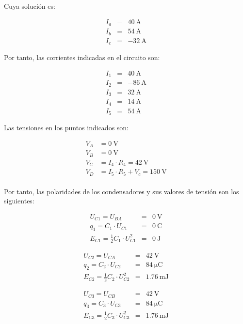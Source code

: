 Cuya solución es:

\begin{eqnarray*}
I_a & = & \qty{40}{\ampere}\\
I_b & = & \qty{54}{\ampere}\\
I_c & = & -\qty{32}{\ampere}
\end{eqnarray*}

Por tanto, las corrientes indicadas en el circuito son:

\begin{eqnarray*}
I_1 & = & \qty{40}{\ampere}\\
I_2 & = & \qty{-86}{\ampere}\\
I_3 & = &  \qty{32}{\ampere}\\
I_4 & = &  \qty{14}{\ampere}\\
I_5 & = &  \qty{54}{\ampere}
\end{eqnarray*}

Las tensiones en los puntos indicados son:

\begin{align*}
V_A &= \qty{0}{\volt}\\
V_B &= \qty{0}{\volt}\\
V_C &= I_4 \cdot R_4 = \qty{42}{\volt}\\
V_D &= I_5 \cdot R_5 + V_c = \qty{150}{\volt}\\
\end{align*}

Por tanto, las polaridades de los condensadores y sus valores de tensión son los siguientes:

\begin{eqnarray*}
U_{C1} = U_{BA} & = & \qty{0}{\volt}\\
q_1 = C_1 \cdot U_{C1} & = & \qty{0}{\coulomb}\\
E_{C1} = \frac{1}{2} C_1 \cdot U_{C1}^2 & = & \qty{0}{\joule}
\end{eqnarray*}

\begin{eqnarray*}
U_{C2} = U_{CA} & = & \qty{42}{\volt}\\
q_2 = C_2 \cdot U_{C2} & = & \qty{84}{\micro\coulomb}\\
E_{C2} = \frac{1}{2} C_2 \cdot U_{C2}^2 & = & \qty{1.76}{\milli\joule}
\end{eqnarray*}

\begin{eqnarray*}
U_{C3} = U_{CB} & = & \qty{42}{\volt}\\
q_3 = C_3 \cdot U_{C3} & = & \qty{84}{\micro\coulomb}\\
E_{C3} = \frac{1}{2} C_3 \cdot U_{C3}^2 & = & \qty{1.76}{\milli\joule}
\end{eqnarray*}

